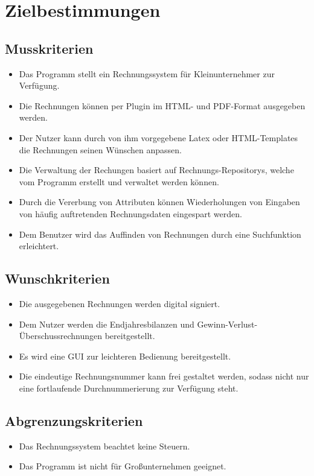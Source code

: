 
\section{Zielbestimmungen}



\subsection{Musskriterien}

\begin{itemize}
	\item Das Programm stellt ein Rechnungssystem für Kleinunternehmer zur Verfügung.
	\item Die Rechnungen können per Plugin im HTML- und PDF-Format ausgegeben werden.
	\item Der Nutzer kann durch von ihm vorgegebene Latex oder HTML-Templates die Rechnungen seinen Wünschen anpassen.
	\item Die Verwaltung der Rechungen basiert auf Rechnungs-Repositorys, welche vom Programm erstellt und verwaltet werden können.
	\item Durch die Vererbung von Attributen können Wiederholungen von Eingaben von häufig auftretenden Rechnungsdaten eingespart werden.
	\item Dem Benutzer wird das Auffinden von Rechnungen durch eine Suchfunktion erleichtert.

\end{itemize}

\subsection{Wunschkriterien}

\begin{itemize}
	\item Die ausgegebenen Rechnungen werden digital signiert.
	\item Dem Nutzer werden die Endjahresbilanzen und Gewinn-Verlust-Überschussrechnungen bereitgestellt.
	\item Es wird eine GUI zur leichteren Bedienung bereitgestellt.
	\item Die eindeutige Rechnungsnummer kann frei gestaltet werden, sodass nicht nur eine fortlaufende Durchnummerierung zur Verfügung steht.
\end{itemize}

\subsection{Abgrenzungskriterien}

\begin{itemize}
	\item Das Rechnungssystem beachtet keine Steuern.
	\item Das Programm ist nicht für Großunternehmen geeignet.
\end{itemize}
